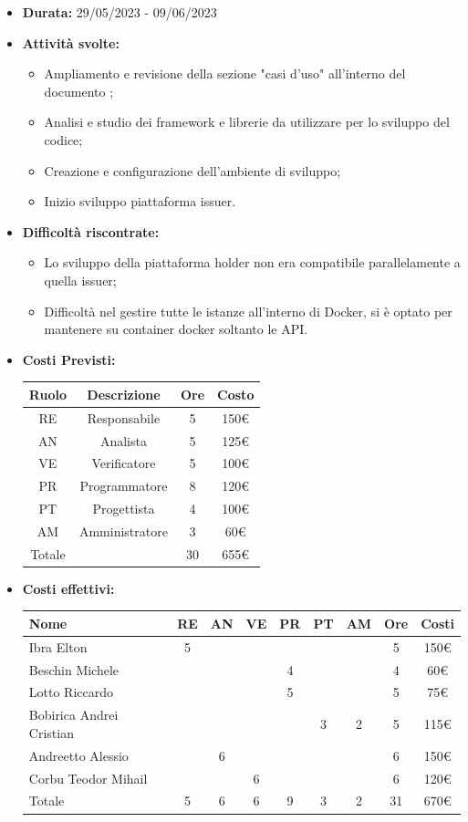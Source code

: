 \begin{itemize}
\item \textbf{Durata:} 29/05/2023 - 09/06/2023 
\item \textbf{Attività svolte:}
\begin{itemize}
    \item Ampliamento e revisione della sezione "casi d'uso" all'interno del documento \AdRdocumento;
    \item Analisi e studio dei framework e librerie da utilizzare per lo sviluppo del codice;
    \item Creazione e configurazione dell'ambiente di sviluppo;
    \item Inizio sviluppo piattaforma issuer.
\end{itemize}
\item \textbf{Difficoltà riscontrate:}
\begin{itemize}
    \item Lo sviluppo della piattaforma holder non era compatibile parallelamente a quella issuer; 
    \item Difficoltà nel gestire tutte le istanze all'interno di Docker\glo, si è optato per mantenere su container docker soltanto le API.
\end{itemize}
\newpage
\item \textbf{Costi Previsti:}
\begin{longtable}{|c|c|c|c|}
    \hline
    Ruolo & Descrizione & Ore & Costo \\
    \hline
    RE & Responsabile & 5 & 150€ \\
    \hline
    AN & Analista & 5 & 125€ \\
    \hline
    VE & Verificatore & 5 & 100€ \\
    \hline
    PR & Programmatore & 8 & 120€ \\
    \hline
    PT & Progettista & 4 & 100€ \\
    \hline
    AM & Amministratore & 3 & 60€ \\
    \hline
    Totale & & 30 & 655€ \\
    \hline
    \end{longtable}
\item \textbf{Costi effettivi:}
\begin{longtable}{|p{}|c|c|c|c|c|c|c|c|}
    \hline
    Nome & RE & AN & VE & PR & PT & AM & Ore & Costi\\
    \hline
    Ibra Elton &5 & & & & & &5 & 150€\\
    \hline
    Beschin Michele & & & &4 & & &4 & 60€ \\
    \hline
    Lotto \newline  Riccardo & & & &5 & & &5& 75€ \\
    \hline
    Bobirica Andrei Cristian & & & & &3 &2 &5 & 115€\\
    \hline
    Andreetto Alessio & &6 & & & & &6 & 150€\\
    \hline
    Corbu Teodor Mihail & & &6 & & & &6 & 120€\\
    \hline
    Totale &5 &6 &6 &9 &3 &2 &31& 670€\\
    \hline
\end{longtable}
\end{itemize}

